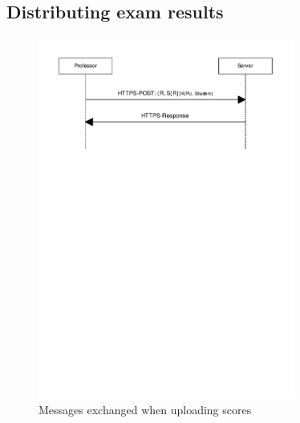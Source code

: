 \documentclass{article}
\begin{document}
\subsection{Distributing exam results}
\label{subsec:impl-results}

\begin{figure}
\begin{center}
\includegraphics[width=0.75\textwidth]{images/upload_scores.pdf}
\caption{Messages exchanged when uploading scores}
\label{fig:upload-scores}
\end{center}
\end{figure}
\end{document}
